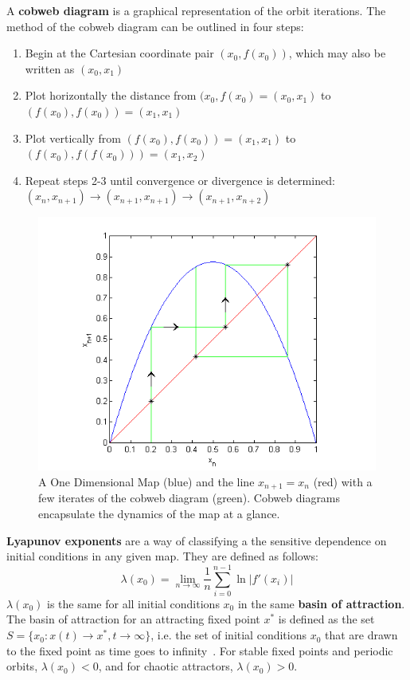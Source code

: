 A \textbf{cobweb diagram} is a graphical representation of the orbit iterations. The method of the cobweb diagram can be outlined in four steps:
\begin{enumerate}
\item Begin at the Cartesian coordinate pair $(x_0, f(x_0))$, which
  may also be written as $(x_0, x_1)$
\item Plot horizontally the distance from $(x_0, f(x_0)=(x_0, x_1)$ to $(f(x_0),
  f(x_0))=(x_1, x_1)$
\item Plot vertically from $(f(x_0), f(x_0))=(x_1, x_1)$ to $(f(x_0), f(f(x_0)))=(x_1, x_2)$
\item Repeat steps 2-3 until convergence or divergence is determined:
  $(x_n, x_{n+1}) \to (x_{n+1}, x_{n+1}) \to (x_{n+1},x_{n+2})$
\end{enumerate}
\begin{figure}[!h]
\caption[Example of a Cobweb Diagram]{A One Dimensional Map (blue) and
  the line $x_{n+1}=x_n$ (red) with a few iterates of the cobweb
  diagram (green). Cobweb diagrams encapsulate the dynamics of the map at a glance.}
    \begin{center}
	\includegraphics[scale=0.8]{figs/cobweb_ex.png}
    \end{center}
\end{figure}

\textbf{Lyapunov exponents} are a way of classifying a the sensitive
dependence on initial conditions in any given map. They are defined as follows:
\begin{equation}
\lambda(x_0) = \lim_{n \to \infty} \frac{1}{n} \sum_{i=0}^{n-1} \ln |f'(x_i)|
\end{equation}
$\lambda(x_0)$ is the same for all initial conditions $x_0$ in the same \textbf{basin of
attraction}. The basin of attraction for an attracting fixed point
$x^*$ is defined as the set $S=\{x_0:x(t) \to x^*, t \to \infty\}$, i.e.
the set of initial conditions $x_0$ that are drawn to the fixed point
as time goes to infinity~\cite{strogatz}. For stable fixed points and periodic orbits, $\lambda(x_0) < 0$,
and for chaotic attractors, $\lambda(x_0)>0$.

